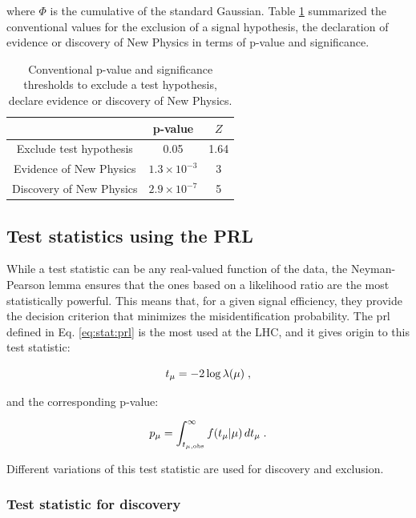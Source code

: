 \noindent where $\Phi$ is the cumulative of the standard Gaussian. Table \ref{tab:stat:thresholds} summarized the conventional values for the exclusion of a signal hypothesis, the declaration of evidence or discovery of New Physics in terms of p-value and significance.

\begin{table}
\center
\begin{tabular}{|c|c|c|}
\hline 
 & p-value  & $Z$ \\ 
\hline 
\hline 
Exclude test hypothesis & 0.05 & 1.64 \\ 
\hline 
Evidence of New Physics & $1.3 \times 10^{-3}$ & 3 \\ 
\hline 
Discovery of New Physics & $2.9 \times 10^{-7}$ & 5 \\ 
\hline 
\end{tabular}
\caption{Conventional p-value and significance thresholds to exclude a test hypothesis, declare evidence or discovery of New Physics.}
\label{tab:stat:thresholds}
\end{table}




\subsection{Test statistics using the PRL}

While a test statistic can be any real-valued function of the data, the Neyman-Pearson lemma \cite{Neyman} ensures that the ones based on a likelihood ratio are the most statistically powerful. This means that, for a given signal efficiency, they provide the decision criterion that minimizes the misidentification probability. The \gls{prl} defined in Eq. \ref{eq:stat:prl} is the most used at the LHC, and it gives origin to this test statistic:

\begin{equation}
\label{eq:stat:tmu}
t_{\mu} = -2 \log \lambda(\mu) \; ,
\end{equation}

\noindent and the corresponding p-value:

\begin{equation}
\label{eq:stat:pmu}
p_{\mu} = \int_{t_{\mu,{\rm obs}}}^{\infty} f(t_{\mu} | \mu ) \,
d t_{\mu} \; .
\end{equation}

\noindent Different variations of this test statistic are used for discovery and exclusion.

\subsubsection*{Test statistic for discovery}

